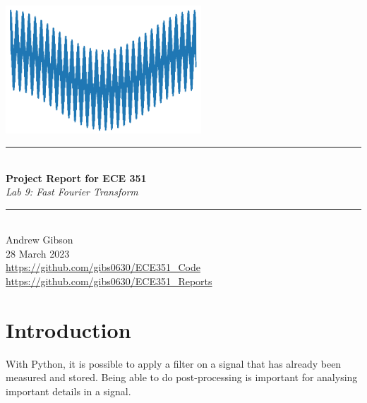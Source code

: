 \documentclass[12pt,a4paper]{article}
\newcommand{\HRule}{\rule{\linewidth}{0.5mm}}
\begin{document}
\begin{titlepage}
\begin{center}
\includegraphics[width=0.55\textwidth]{titlepage_image.png}~\\[2cm]
\HRule \\[0.4cm]
{ \LARGE 
  \textbf{Project Report for ECE 351}\\[0.4cm]
  \emph{Lab 9: Fast Fourier Transform}\\[0.4cm]
}
\HRule \\[1.5cm]
{ \large
  Andrew Gibson \\[0.1cm]
 28 March 2023\\[0.1cm]
  \url{https://github.com/gibs0630/ECE351\_Code}\\[0.1cm]
  \url{https://github.com/gibs0630/ECE351\_Reports}\\[0.1cm]
}
\vfill
{\large }
 
\end{center}
\end{titlepage}
\newpage
\tableofcontents
{}
\newpage
\setcounter{page}{1}
\section{Introduction}\label{sec:intro}
With Python, it is possible to apply a filter on a signal that has already been measured and stored.  Being able to do post-processing is important for analysing important details in a signal.
\end{document}
